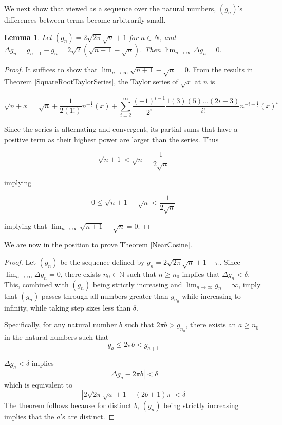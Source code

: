 \documentclass{amsart}
\newtheorem{lemma}[theorem]{Lemma}
\begin{document}
We next show that viewed as a sequence over the natural numbers, $(g_n)$'s differences between terms become arbitrarily small.

\begin{lemma}
\label{LimitDeltaGIs0}
Let $(g_n) = 2\sqrt{2 \pi}\sqrt{n} + 1$ for $n \in N$, and $\Delta g_n = g_{n+1} - g_n = 2\sqrt{2}(\sqrt{n+1} - \sqrt{n})$. Then $\lim_{n\rightarrow\infty} \Delta g_n = 0$.
\end{lemma}

\begin{proof}
It suffices to show that $\lim_{n\rightarrow\infty} \sqrt{n+1} - \sqrt{n} = 0$. From the results in Theorem \ref{SquareRootTaylorSeries}, the Taylor series of $\sqrt{x}$ at $n$ is

\[
\sqrt{n+x} = \sqrt{n} + \frac{1}{2(1!)} n^{-\frac{1}{2}}(x) + \sum_{i=2}^{\infty} \frac{(-1)^{i-1}}{2^i} \frac{1(3)(5)...(2i-3)}{i!} n^{-i + \frac{1}{2}}(x)^i
\]

Since the series is alternating and convergent, its partial sums that have a positive term as their highest power are larger than the series. Thus

\[
\sqrt{n+1} < \sqrt{n} + \frac{1}{2\sqrt{n}}
\]

implying

\[
0 \leq \sqrt{n+1}- \sqrt{n} < \frac{1}{2\sqrt{n}}
\]

implying that $\lim_{n\rightarrow\infty} \sqrt{n+1} - \sqrt{n} = 0$.

\end{proof}

We are now in the position to prove Theorem \ref{NearCosine}.

\begin{proof}
Let $(g_n)$ be the sequence defined by $g_n = 2\sqrt{2\pi}\sqrt{n} + 1 - \pi$. Since $\lim_{n\rightarrow\infty} \Delta g_n = 0$, there exists $n_0 \in \mathbb{N}$ such that $n \geq n_0$ implies that $\Delta g_n < \delta$. This, combined with $(g_n)$ being strictly increasing and $\lim_{n\rightarrow\infty} g_n = \infty$, imply that $(g_n)$ passes through all numbers greater than $g_{n_0}$ while increasing to infinity, while taking step sizes less than $\delta$.

Specifically, for any natural number $b$ such that $2\pi b > g_{n_0}$, there exists an $a \geq n_0$ in the natural numbers such that
\[
g_a \leq 2\pi b < g_{a+1}
\]

$\Delta g_a < \delta$ implies
\[
|\Delta g_a - 2\pi b| < \delta
\]
which is equivalent to
\[
|2\sqrt{2\pi}\sqrt{a} + 1 - (2b + 1)\pi| < \delta
\]
The theorem follows because for distinct $b$, $(g_n)$ being strictly increasing implies that the $a$'s are distinct.
\end{proof}
\end{document}
